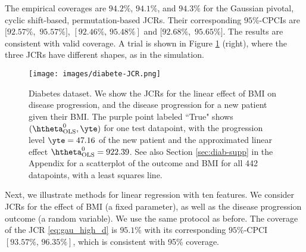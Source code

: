 \documentclass[english]{article}
\begin{document}
The empirical coverages are $94.2\%$, $94.1\%$, and $94.3\%$ for the Gaussian pivotal, cyclic shift-based, permutation-based JCRs.
Their corresponding $95\%$-CPCIs are $[92.57\%$, $\,95.57\%]$, $[92.46\%,\,95.48\%]$  and $[92.68\%$, $\,95.65\%]$.
The results are consistent with valid coverage. 
A trial is shown in Figure \ref{fig:diabete-JCR} (right), where the three JCRs have different shapes, as in the simulation.
\begin{figure}[ht]
  \centering
    \texttt{[image: images/diabete-JCR.png]}
  \caption{
  Diabetes dataset.
  We show the
  JCRs for the linear effect of BMI on disease progression, and the disease progression for a new patient given their BMI. 
  The purple point labeled ``True"
  shows $(\htheta_{\mathrm{OLS}}^0, \yte)$ for one test datapoint,
  with the progression level $\yte = 47.16$ of the new patient and the approximated linear effect $\htheta_{\mathrm{OLS}}^0 = 922.39$. 
  See also Section \ref{sec:diab-supp} in the Appendix for a scatterplot of the outcome and BMI for all 442 datapoints, with a least squares line.}
  \label{fig:diabete-JCR}
\end{figure}
Next, we illustrate methods for linear regression 
with ten features. 
We consider JCRs for the effect of BMI (a fixed parameter), 
as well as the disease progression outcome (a random variable). 
We use the same protocol as before.
The coverage of the JCR \eqref{eq:gau_high_d} 
is $95.1\%$ with its corresponding $95\%$-CPCI $[93.57\%, \,96.35\%]$, 
which is consistent with 95\% coverage.
\end{document}
